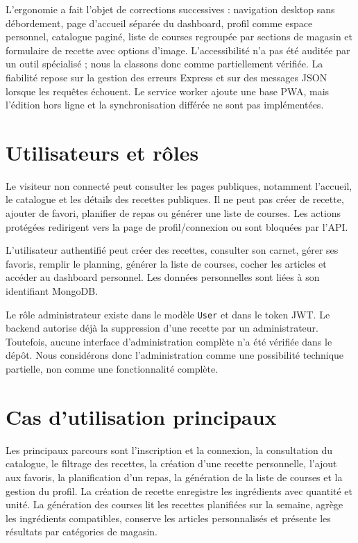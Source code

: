 \documentclass[12pt,a4paper]{report}
\begin{document}
L'ergonomie a fait l'objet de corrections successives : navigation desktop sans débordement, page d'accueil séparée du dashboard, profil comme espace personnel, catalogue paginé, liste de courses regroupée par sections de magasin et formulaire de recette avec options d'image. L'accessibilité n'a pas été auditée par un outil spécialisé ; nous la classons donc comme partiellement vérifiée. La fiabilité repose sur la gestion des erreurs Express et sur des messages JSON lorsque les requêtes échouent. Le service worker ajoute une base PWA, mais l'édition hors ligne et la synchronisation différée ne sont pas implémentées.

\section{Utilisateurs et rôles}
Le visiteur non connecté peut consulter les pages publiques, notamment l'accueil, le catalogue et les détails des recettes publiques. Il ne peut pas créer de recette, ajouter de favori, planifier de repas ou générer une liste de courses. Les actions protégées redirigent vers la page de profil/connexion ou sont bloquées par l'API.

L'utilisateur authentifié peut créer des recettes, consulter son carnet, gérer ses favoris, remplir le planning, générer la liste de courses, cocher les articles et accéder au dashboard personnel. Les données personnelles sont liées à son identifiant MongoDB.

Le rôle administrateur existe dans le modèle \texttt{User} et dans le token JWT. Le backend autorise déjà la suppression d'une recette par un administrateur. Toutefois, aucune interface d'administration complète n'a été vérifiée dans le dépôt. Nous considérons donc l'administration comme une possibilité technique partielle, non comme une fonctionnalité complète.

\section{Cas d'utilisation principaux}
Les principaux parcours sont l'inscription et la connexion, la consultation du catalogue, le filtrage des recettes, la création d'une recette personnelle, l'ajout aux favoris, la planification d'un repas, la génération de la liste de courses et la gestion du profil. La création de recette enregistre les ingrédients avec quantité et unité. La génération des courses lit les recettes planifiées sur la semaine, agrège les ingrédients compatibles, conserve les articles personnalisés et présente les résultats par catégories de magasin.
\end{document}
